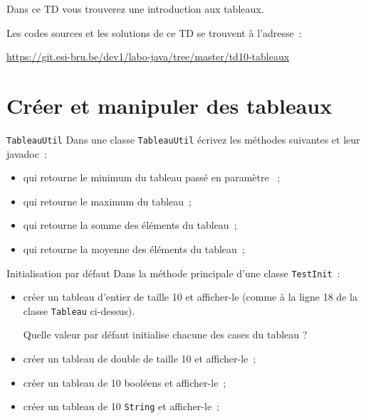 \documentclass[a4paper,11pt]{article}
\date{2018 -- 2019}
\newcommand{\publicbasepath}{https://git.esi-bru.be/dev1/labo-java/tree/master/td10-tableaux}
\begin{document}
\entete
\titre
{}
\lastedit


	Dans ce TD vous trouverez une introduction aux tableaux.
	 
	Les codes sources et les solutions de ce TD se trouvent à l'adresse~: 
	
	\url{\publicbasepath}	


	\tableofcontents

	\newpage

\section{Créer et manipuler des tableaux}


 
	\begin{Exercice}{\texttt{TableauUtil}}	
		Dans une classe \texttt{TableauUtil} écrivez les méthodes suivantes et leur 
		javadoc~:
		\begin{itemize}
			\item {} qui retourne le minimum
				du tableau passé en paramètre ~;
			\item {} qui retourne le maximum
				du tableau~;
			\item {} qui retourne la somme
				des éléments du tableau~;
			\item {} qui retourne la
				 moyenne des éléments du tableau~;
		\end{itemize}
	\end{Exercice}

	\begin{Exercice}{Initialisation par défaut}	
		Dans la méthode principale d'une classe \texttt{TestInit}~:
		\begin{itemize}
			\item créer un tableau d'entier de taille 10 et afficher-le 
				(comme à  la ligne 18 de la classe \texttt{Tableau} ci-dessus). 
				
				Quelle valeur par défaut initialise chacune des cases du tableau ?
			\item créer un tableau de double de taille 10 et afficher-le~;
			\item créer un tableau de 10 booléens et afficher-le~;
			\item créer un tableau de 10 \texttt{String} et afficher-le~;
		\end{itemize}
	\end{Exercice}
\end{document}
